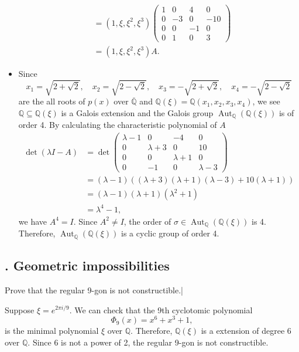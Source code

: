\begin{solution}
\begin{itemize}
\begin{align*}
			&=\left(1, \xi, \xi^2, \xi^3\right)
			\begin{pmatrix}
				1&0&4&0\\
				0&-3&0&-10\\
				0&0&-1&0\\
				0&1&0&3
			\end{pmatrix}\\
			&=\left(1, \xi, \xi^2, \xi^3\right)A.
		\end{align*}
		\item Since
		\[
			x_1=\sqrt{2+\sqrt{2}},\quad x_2=\sqrt{2-\sqrt{2}},\quad x_3=-\sqrt{2+\sqrt{2}},\quad x_4=-\sqrt{2-\sqrt{2}}
		\]
		are the all roots of $p(x)$ over $\overline{\mathbb{Q}}$ and $\mathbb{Q}(\xi)=\mathbb{Q}(x_1,x_2,x_3,x_4)$, we see $\mathbb{Q}\subseteq\mathbb{Q}(\xi)$ is a Galois extension and the Galois group $\operatorname{Aut}_{\mathbb{Q}}(\mathbb{Q}(\xi))$ is of order 4. By calculating the characteristic polynomial of $A$
		\begin{align*}
			\det\left(\lambda I-A\right)&=\det \begin{pmatrix}
				\lambda-1&0&-4&0\\
				0&\lambda+3&0&10\\
				0&0&\lambda+1&0\\
				0&-1&0&\lambda-3
			\end{pmatrix}\\
			&=(\lambda-1)\left((\lambda+3)(\lambda+1)(\lambda-3)+10(\lambda+1)\right)\\
			&=(\lambda-1)(\lambda+1)\left(\lambda^2+1\right)\\
			&=\lambda^4-1,
		\end{align*}
		we have $A^4=I$. Since $A^2\ne I$, the order of $\sigma\in \operatorname{Aut}_{\mathbb{Q}}(\mathbb{Q}(\xi))$ is 4. Therefore, $\operatorname{Aut}_{\mathbb{Q}}(\mathbb{Q}(\xi))$ is a cyclic group of order 4.
	\end{itemize}
\end{solution}

\subsection{. Geometric impossibilities}
\begin{problem}[3.14]
Prove that the regular 9-gon is not constructible.|
\end{problem}
\begin{solution}
Suppose $\xi=e^{2\pi i/9}$. We can check that the 9th cyclotomic polynomial 
\[
	\Phi_9(x)=x^6+x^3+1,
\]
is the minimal polynomial $\xi$ over $\mathbb{Q}$. Therefore, $\mathbb{Q}(\xi)$ is a extension of degree 6 over $\mathbb{Q}$. Since 6 is not a power of 2, the regular 9-gon is not constructible.
\end{solution}

